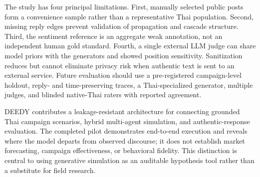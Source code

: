 \documentclass[conference]{IEEEtran}
\begin{document}
The study has four principal limitations. First, manually selected public
posts form a convenience sample rather than a representative Thai population.
Second, missing reply edges prevent validation of propagation and cascade
structure. Third, the sentiment reference is an aggregate weak annotation,
not an independent human gold standard. Fourth, a single external LLM judge
can share model priors with the generators and showed position sensitivity.
Sanitization reduces but cannot eliminate privacy risk when authentic text is
sent to an external service. Future evaluation should use a pre-registered
campaign-level holdout, reply- and time-preserving traces, a Thai-specialized
generator, multiple judges, and blinded native-Thai raters with reported
agreement.

DEEDY contributes a leakage-resistant architecture for connecting grounded
Thai campaign scenarios, hybrid multi-agent simulation, and authentic-response
evaluation. The completed pilot demonstrates end-to-end execution and reveals
where the model departs from observed discourse; it does not establish market
forecasting, campaign effectiveness, or behavioral fidelity. This distinction
is central to using generative simulation as an auditable hypothesis tool
rather than a substitute for field research.



\end{document}

